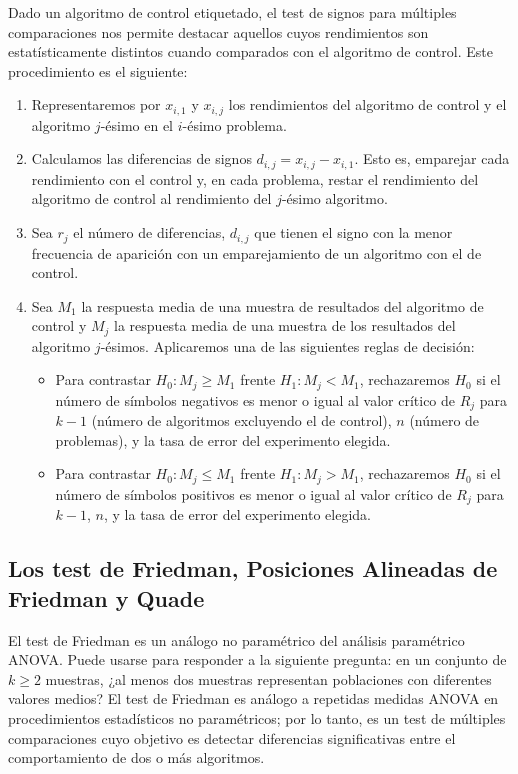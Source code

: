 Dado un algoritmo de control etiquetado, el test de signos para múltiples comparaciones nos permite destacar aquellos cuyos rendimientos son estatísticamente distintos cuando comparados con el algoritmo de control. 
Este procedimiento es el siguiente:
\begin{enumerate}
	\item Representaremos por $x_{i,1}$ y $x_{i,j}$ los rendimientos del algoritmo de control y el algoritmo $j$-ésimo en el $i$-ésimo problema.
	\item Calculamos las diferencias de signos $d_{i,j} = x_{i,j} - x_{i,1}$. 
Esto es, emparejar cada rendimiento con el control y, en cada problema, restar el rendimiento del algoritmo de control al rendimiento del $j$-ésimo algoritmo. 
	\item Sea $r_j$ el número de diferencias, $d_{i,j}$ que tienen el signo con la menor frecuencia de aparición con un emparejamiento de un algoritmo con el de control. 
	\item Sea $M_1$ la respuesta media de una muestra de resultados del algoritmo de control y $M_j$ la respuesta media de una muestra de los resultados del algoritmo $j$-ésimos. 
Aplicaremos una de las siguientes reglas de decisión:
	\begin{itemize}
		\item Para contrastar $H_0 : M_j \geq M_1$ frente $H_1:M_j < M_1$, rechazaremos $H_0$ si el número de símbolos negativos es menor o igual al valor crítico de $R_j$ para $k-1$ (número de algoritmos excluyendo el de control), $n$ (número de problemas), y la tasa de error del experimento elegida. 
		\item Para contrastar $H_0 : M_j \leq M_1$ frente $H_1:M_j > M_1$, rechazaremos $H_0$ si el número de símbolos positivos es menor o igual al valor crítico de $R_j$ para $k-1$, $n$, y la tasa de error del experimento elegida.  
	\end{itemize}
\end{enumerate}

\subsection{Los test de Friedman, Posiciones Alineadas de Friedman y Quade}

El test de Friedman es un análogo no paramétrico del análisis paramétrico ANOVA. 
Puede usarse para responder a la siguiente pregunta: 
en un conjunto de $k\geq 2$ muestras, ¿al menos dos muestras representan poblaciones con diferentes valores medios? 
El test de Friedman es análogo a repetidas medidas ANOVA en procedimientos estadísticos no paramétricos; por lo tanto, es un test de múltiples comparaciones cuyo objetivo es detectar diferencias significativas entre el comportamiento de dos o más algoritmos. 

